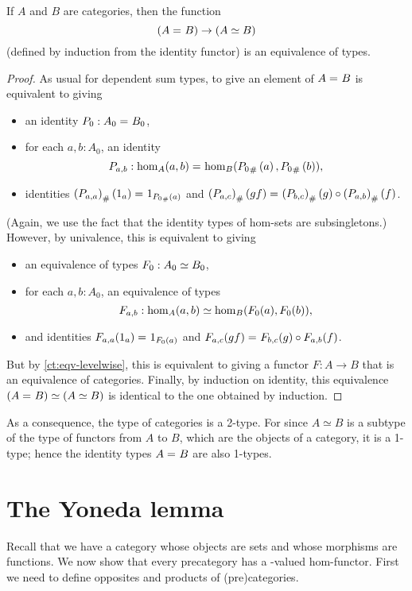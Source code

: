 \begin{thm}\label{ct:cat-2cat}
  If $A$ and $B$ are categories, then the function
  \[(A =_{} B) \to (A\simeq B)\]
  (defined by induction from the identity functor) is an equivalence of types.
\end{thm}
\begin{proof}
  As usual for dependent sum types, to give an element of $A =_{} B$ is equivalent to giving
  \begin{itemize}
  \item an identity $P_0:A_0 =_{} B_0$,
  \item for each $a,b:A_0$, an identity
    \[P_{a,b}:\hom_A(a,b) =_{} \hom_B({P_0}_{\#}\left({a}\right),{P_0}_{\#}\left({b}\right)),\]
  \item identities ${(P_{a,a})}_{\#}\left({1_a}\right) =_{} 1_{{P_0}_{\#}\left({a}\right)}$ and ${(P_{a,c})}_{\#}\left({gf}\right) =_{} {(P_{b,c})}_{\#}\left({g}\right) \circ {(P_{a,b})}_{\#}\left({f}\right)$.
  \end{itemize}
  (Again, we use the fact that the identity types of hom-sets are subsingletons.)
  However, by univalence, this is equivalent to giving
  \begin{itemize}
  \item an equivalence of types $F_0:A_0 \simeq B_0$,
  \item for each $a,b:A_0$, an equivalence of types
    \[F_{a,b}:\hom_A(a,b) \simeq \hom_B(F_0 (a),F_0 (b)),\]
  \item and identities $F_{a,a}(1_a) =_{} 1_{F_0 (a)}$ and $F_{a,c}(gf) =_{} F_{b,c} (g)\circ F_{a,b} (f)$.
  \end{itemize}
  But by \autoref{ct:eqv-levelwise}, this is equivalent to giving a functor $F:A\to B$ that is an equivalence of categories.
  Finally, by induction on identity, this equivalence $(A =_{} B) \simeq (A\simeq B)$ is identical to the one obtained by induction.
\end{proof}

As a consequence, the type of categories is a 2-type.
For since $A\simeq B$ is a subtype of the type of functors from $A$ to $B$, which are the objects of a category, it is a 1-type; hence the identity types $A =_{} B$ are also 1-types.

\section{The Yoneda lemma}
\label{sec:yoneda}

Recall that we have a category \uset whose objects are sets and whose morphisms are functions.
We now show that every precategory has a \uset-valued hom-functor.
First we need to define opposites and products of (pre)categories.


